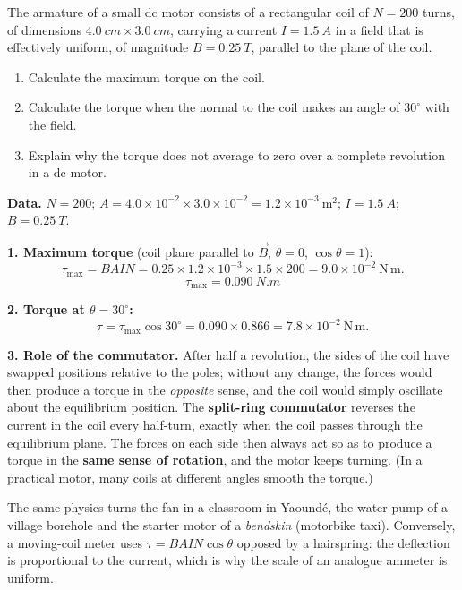 \documentclass[11pt]{article}
\begin{document}
\begin{exoresolu}
The armature of a small dc motor consists of a rectangular coil of $N=200$ turns, of dimensions $\SI{4.0}{cm}\times\SI{3.0}{cm}$, carrying a current $I=\SI{1.5}{A}$ in a field that is effectively uniform, of magnitude $B=\SI{0.25}{T}$, parallel to the plane of the coil.
\begin{enumerate}
\item Calculate the maximum torque on the coil.
\item Calculate the torque when the normal to the coil makes an angle of $30^{\circ}$ with the field.
\item Explain why the torque does not average to zero over a complete revolution in a dc motor.
\end{enumerate}
\tcblower
\textbf{Data.} $N=200$; $A=4.0\times10^{-2}\times3.0\times10^{-2}=1.2\times10^{-3}\ \mathrm{m^2}$; $I=\SI{1.5}{A}$; $B=\SI{0.25}{T}$.

\textbf{1. Maximum torque} (coil plane parallel to $\vec{B}$, $\theta=0$, $\cos\theta=1$):
\[ \tau_{\max}=BAIN=0.25\times1.2\times10^{-3}\times1.5\times200
=9.0\times10^{-2}\ \mathrm{N\,m}. \]
\[ \boxed{\tau_{\max}=\SI{0.090}{N.m}} \]

\textbf{2. Torque at $\theta=30^{\circ}$:}
\[ \tau=\tau_{\max}\cos 30^{\circ}=0.090\times0.866=7.8\times10^{-2}\ \mathrm{N\,m}. \]

\textbf{3. Role of the commutator.} After half a revolution, the sides of the coil have swapped positions relative to the poles; without any change, the forces would then produce a torque in the \emph{opposite} sense, and the coil would simply oscillate about the equilibrium position. The \textbf{split-ring commutator} reverses the current in the coil every half-turn, exactly when the coil passes through the equilibrium plane. The forces on each side then always act so as to produce a torque in the \textbf{same sense of rotation}, and the motor keeps turning. (In a practical motor, many coils at different angles smooth the torque.)
\end{exoresolu}

\begin{savaistu}
The same physics turns the fan in a classroom in Yaound\'e, the water pump of a village borehole and the starter motor of a \emph{bendskin} (motorbike taxi). Conversely, a moving-coil meter uses $\tau=BAIN\cos\theta$ opposed by a hairspring: the deflection is proportional to the current, which is why the scale of an analogue ammeter is uniform.
\end{savaistu}
\end{document}
